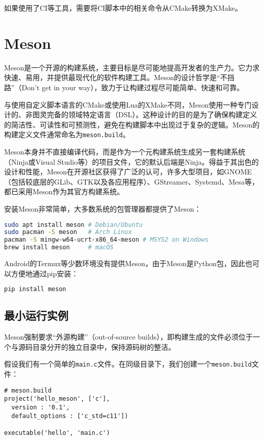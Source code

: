 如果使用了CI等工具，需要将CI脚本中的相关命令从CMake转换为XMake。

\section{Meson}

Meson是一个开源的构建系统，主要目标是尽可能地提高开发者的生产力。它力求快速、易用，并提供最现代化的软件构建工具。Meson的设计哲学是“不挡路”（Don't get in your way），致力于让构建过程尽可能简单、快速和可靠。

与使用自定义脚本语言的CMake或使用Lua的XMake不同，Meson使用一种专门设计的、非图灵完备的领域特定语言（DSL）。这种设计的目的是为了确保构建定义的简洁性、可读性和可预测性，避免在构建脚本中出现过于复杂的逻辑。Meson的构建定义文件通常命名为\texttt{meson.build}。

Meson本身并不直接编译代码，而是作为一个元构建系统生成另一套构建系统（Ninja或Visual Studio等）的项目文件，它的默认后端是Ninja。得益于其出色的设计和性能，Meson在开源社区获得了广泛的认可，许多大型项目，如GNOME（包括较底层的GLib、GTK以及各应用程序）、GStreamer、Systemd、Mesa等，都已采用Meson作为其官方构建系统。

安装Meson非常简单，大多数系统的包管理器都提供了Meson：
\begin{lstlisting}[language=bash]
sudo apt install meson # Debian/Ubuntu
sudo pacman -S meson   # Arch Linux
pacman -S mingw-w64-ucrt-x86_64-meson # MSYS2 on Windows
brew install meson     # macOS
\end{lstlisting}

Android的Termux等少数环境没有提供Meson，由于Meson是Python包，因此也可以方便地通过pip安装：
\begin{lstlisting}[language=bash]
pip install meson
\end{lstlisting}

\subsection{最小运行实例}
Meson强制要求“外源构建”（out-of-source builds），即构建生成的文件必须位于一个与源码目录分开的独立目录中，保持源码树的整洁。

假设我们有一个简单的\texttt{main.c}文件。在同级目录下，我们创建一个\texttt{meson.build}文件：
\begin{lstlisting}
# meson.build
project('hello_meson', ['c'],
  version : '0.1',
  default_options : ['c_std=c11'])

executable('hello', 'main.c')
\end{lstlisting}

